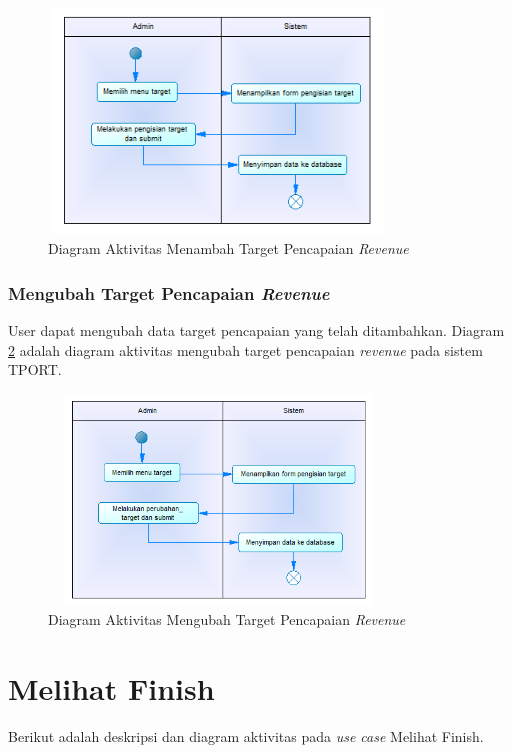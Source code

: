 	\begin{figure}[h]
	\centerline {\includegraphics[width=9cm,height=6cm]{bab4/activity_menambah_target_pencapaian_revenue.png}}
	\caption{Diagram Aktivitas Menambah Target Pencapaian \textit{Revenue}}
	\label{figure:activity_menambah_target_pencapaian_revenue}
	\end{figure}
		
	\subsubsection{Mengubah Target Pencapaian \textit{Revenue}}
	User dapat mengubah data target pencapaian yang telah ditambahkan. Diagram \ref{figure:activity_mengubah_target_pencapaian_revenue} adalah diagram aktivitas mengubah target pencapaian \textit{revenue} pada sistem TPORT.
	
	\begin{figure}[h]
	\centerline {\includegraphics[width=9cm,height=5.6cm]{bab4/activity_mengubah_target_pencapaian_revenue.png}}
	\caption{Diagram Aktivitas Mengubah Target Pencapaian \textit{Revenue}}
	\label{figure:activity_mengubah_target_pencapaian_revenue}
	\end{figure}		
	
\section{Melihat Finish}
Berikut adalah deskripsi dan diagram aktivitas pada \textit{use case} Melihat Finish.
